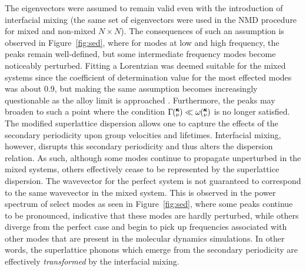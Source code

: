 \documentclass[aps,prb,preprint,preprintnumbers,amsmath,amssymb,floatfix,superscriptaddress]{revtex4}
\newcommand{\kv}{\mspace{-4.0mu}\left(\mspace{-8.0mu}
\begin{smallmatrix}&\pmb{\kappa} \\&\nu\end{smallmatrix}
\mspace{-3.0mu}\right)}
\begin{document}
The eigenvectors were assumed to remain valid even with the introduction of interfacial mixing (the same set of eigenvectors were used in the NMD procedure for mixed and non-mixed $N\times N$). The consequences of such an assumption is observed in Figure~\ref{fig:sed}, where for modes at low and high frequency, the peaks remain well-defined, but some intermediate frequency modes become noticeably perturbed. Fitting a Lorentzian was deemed suitable for the mixed systems since the coefficient of determination value \cite{Cowpe20081066} for the most effected modes was about 0.9, but making the same assumption becomes increasingly questionable as the alloy limit is approached \cite{jason2013vc}. Furthermore, the peaks may broaden to such a point where the condition $\Gamma\kv \ll \omega\kv$ is no longer satisfied. The modified superlattice dispersion allows one to capture the effects of the secondary periodicity upon group velocities and lifetimes. Interfacial mixing, however, disrupts this secondary periodicity and thus alters the dispersion relation. As such, although some modes continue to propagate unperturbed in the mixed systems, others effectively cease to be represented by the superlattice dispersion. The wavevector for the perfect system is not guaranteed to  correspond to the same wavevector in the mixed system. This is observed in the power spectrum of select modes as seen in Figure~\ref{fig:sed}, where some peaks continue to be pronounced, indicative that these modes are hardly perturbed, while others diverge from the perfect case and begin to pick up frequencies associated with other modes that are present in the molecular dynamics simulations. In other words, the superlattice phonons which emerge from the secondary periodicity are effectively \textit{transformed} by the interfacial mixing.
\end{document}

